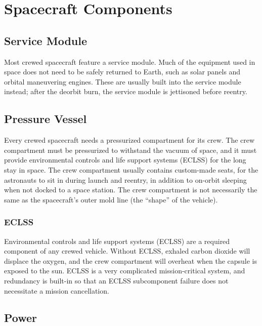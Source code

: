 
\chapter{Spacecraft Components}

\section{Service Module}

Most crewed spacecraft feature a service module. Much of the equipment
used in space does not need to be safely returned to Earth, such as
solar panels and orbital maneuvering engines. These are usually built
into the service module instead; after the deorbit burn, the service
module is jettisoned before reentry.


\section{Pressure Vessel}

Every crewed spacecraft needs a pressurized compartment for its
crew. The crew compartment must be pressurized to withstand the vacuum
of space, and it must provide environmental controls and life support
systems (ECLSS) for the long stay in space. The crew compartment
usually contains custom-made seats, for the astronauts to sit in
during launch and reentry, in addition to on-orbit sleeping when not
docked to a space station. The crew compartment is not necessarily the
same as the spacecraft's outer mold line (the ``shape'' of the vehicle).


\subsection{ECLSS}

Environmental controls and life support systems (ECLSS) are
a required component of any crewed vehicle. Without ECLSS, exhaled
carbon dioxide will displace the oxygen, and the crew compartment will
overheat when the capsule is exposed to the sun. ECLSS is a very
complicated mission-critical system, and redundancy is built-in so
that an ECLSS subcomponent failure does not necessitate a mission
cancellation.

\section{Power}

